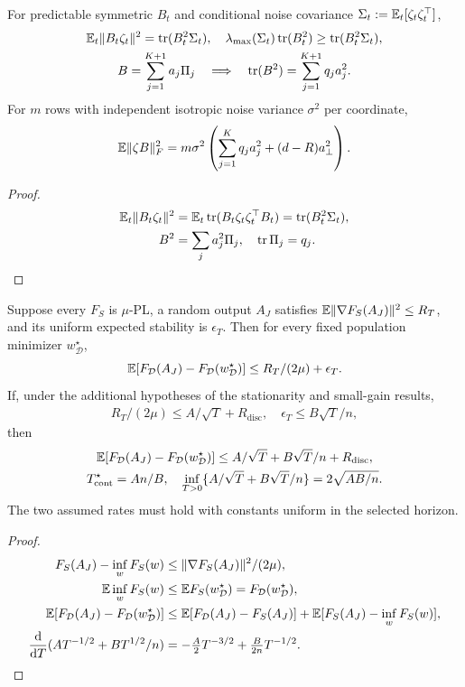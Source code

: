 \begin{proposition}\label{prop:rigid-noise}
For predictable symmetric $B_t$ and conditional noise covariance
$\Sigma_t:=\mathbb E_t[\zeta_t\zeta_t^\top]$,
\begin{gather}
 \mathbb E_t\|B_t\zeta_t\|^2=\operatorname{tr}(B_t^2\Sigma_t),\quad
 \lambda_{\max}(\Sigma_t)\operatorname{tr}(B_t^2)\ge\operatorname{tr}(B_t^2\Sigma_t),\\
 B=\sum_{j=1}^{K+1}a_j\Pi_j\quad\Longrightarrow\quad
 \operatorname{tr}(B^2)=\sum_{j=1}^{K+1}q_ja_j^2.
\end{gather}
For $m$ rows with independent isotropic noise variance $\sigma^2$ per coordinate,
\begin{equation}
 \mathbb E\|\zeta B\|_F^2=m\sigma^2
       \left(\sum_{j=1}^Kq_ja_j^2+(d-R)a_\perp^2\right).
\end{equation}
\end{proposition}
\begin{proof}
\begin{align}
 \mathbb E_t\|B_t\zeta_t\|^2
 &=\mathbb E_t\operatorname{tr}(B_t\zeta_t\zeta_t^\top B_t)=\operatorname{tr}(B_t^2\Sigma_t),\\
 B^2&=\sum_ja_j^2\Pi_j,\quad\operatorname{tr}\Pi_j=q_j.
\end{align}
\end{proof}
\begin{corollary}\label{cor:rigid-risk}
Suppose every $F_S$ is $\mu$-PL, a random output $A_J$ satisfies
$\mathbb E\|\nabla F_S(A_J)\|^2\le R_T$, and its uniform expected stability is
$\epsilon_T$. Then for every fixed population minimizer $w_\mathcal D^\star$,
\begin{equation}
 \mathbb E[F_\mathcal D(A_J)-F_\mathcal D(w_\mathcal D^\star)]
 \le R_T/(2\mu)+\epsilon_T.
\end{equation}
If, under the additional hypotheses of the stationarity and small-gain results,
\begin{gather}
 R_T/(2\mu)\le A/\sqrt T+R_{\mathrm{disc}},\quad
 \epsilon_T\le B\sqrt T/n,
\end{gather}
then
\begin{gather}
 \mathbb E[F_\mathcal D(A_J)-F_\mathcal D(w_\mathcal D^\star)]
 \le A/\sqrt T+B\sqrt T/n+R_{\mathrm{disc}},\\
 T_\mathrm{cont}^\star=An/B,\quad
 \inf_{T>0}\{A/\sqrt T+B\sqrt T/n\}=2\sqrt{AB/n}.
\end{gather}
The two assumed rates must hold with constants uniform in the selected horizon.
\end{corollary}
\begin{proof}
\begin{align}
 F_S(A_J)-\inf_wF_S(w)&\le\|\nabla F_S(A_J)\|^2/(2\mu),\\
 \mathbb E\inf_wF_S(w)&\le\mathbb E F_S(w_\mathcal D^\star)
 =F_\mathcal D(w_\mathcal D^\star),\\
 \mathbb E[F_\mathcal D(A_J)-F_\mathcal D(w_\mathcal D^\star)]
 &\le\mathbb E[F_\mathcal D(A_J)-F_S(A_J)]
       +\mathbb E[F_S(A_J)-\inf_wF_S(w)],\\
 \frac{\mathrm d}{\mathrm dT}(AT^{-1/2}+BT^{1/2}/n)
 &=-\tfrac A2T^{-3/2}+\tfrac B{2n}T^{-1/2}.
\end{align}
\end{proof}
